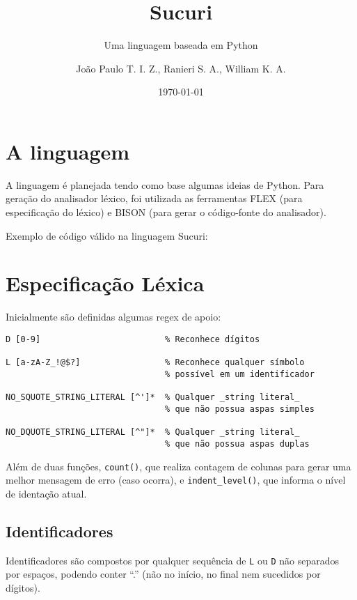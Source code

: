 \documentclass[headings=standardclasses, headings=big]{scrreprt}
\title{Sucuri}
\subtitle{Uma linguagem baseada em Python}
\author{João Paulo T. I. Z., Ranieri S. A., William K. A.}
\date{\today}
\begin{document}
\maketitle

\clearpage

\section{A linguagem}

A linguagem é planejada tendo como base algumas ideias de Python. Para geração
do analisador léxico, foi utilizada as ferramentas FLEX (para especificação do
léxico) e BISON (para gerar o código-fonte do analisador).

Exemplo de código válido na linguagem Sucuri:



\clearpage

\section{Especificação Léxica}

Inicialmente são definidas algumas regex de apoio:

\begin{verbatim}
D [0-9]                         % Reconhece dígitos

L [a-zA-Z_!@$?]                 % Reconhece qualquer símbolo
                                % possível em um identificador

NO_SQUOTE_STRING_LITERAL [^']*  % Qualquer _string literal_
                                % que não possua aspas simples

NO_DQUOTE_STRING_LITERAL [^"]*  % Qualquer _string literal_
                                % que não possua aspas duplas
\end{verbatim}

Além de duas funções, \texttt{count()}, que realiza contagem de colunas para
gerar uma melhor mensagem de erro (caso ocorra), e \texttt{indent\_level()},
que informa o nível de identação atual.

\subsection{Identificadores}

Identificadores são compostos por qualquer sequência de \texttt{L} ou
\texttt{D} não separados por espaços, podendo conter ``.'' (não no início, no
final nem sucedidos por dígitos).
\end{document}
